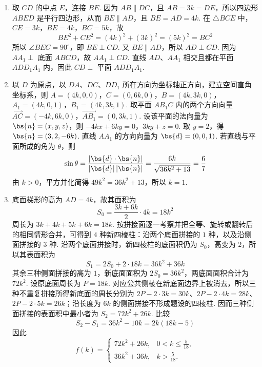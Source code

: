 \begin{solution}
\begin{enumerate}
\item 取 \(CD\) 的中点 \(E\)，连接 \(BE\). 因为 \(AB\parallel DC\)，且 \(AB=3k=DE\)，所以四边形 \(ABED\) 是平行四边形，从而 \(BE\parallel AD\)，且 \(BE=AD=4k\). 在 \(\triangle BCE\) 中，\(CE=3k\)，\(BE=4k\)，\(BC=5k\)，故
\[
BE^2+CE^2=(4k)^2+(3k)^2=(5k)^2=BC^2
\]
所以 \(\angle BEC=90^\circ\)，即 \(BE\perp CD\). 又 \(BE\parallel AD\)，所以 \(AD\perp CD\). 因为 \(AA_1\perp\) 底面 \(ABCD\)，故 \(AA_1\perp CD\). 直线 \(AD\)、\(AA_1\) 相交且都在平面 \(ADD_1A_1\) 内，因此 \(CD\perp\) 平面 \(ADD_1A_1\).
\item 以 \(D\) 为原点，以 \(DA\)、\(DC\)、\(DD_1\) 所在方向为坐标轴正方向，建立空间直角坐标系，则
\(A=(4k,0,0)\)，\(C=(0,6k,0)\)，\(B=(4k,3k,0)\)，\(A_1=(4k,0,1)\)，\(B_1=(4k,3k,1)\).
取平面 \(AB_1C\) 内的两个方向向量
\(\overrightarrow{AC}=(-4k,6k,0)\)，\(\overrightarrow{AB_1}=(0,3k,1)\).
设该平面的法向量为 \(\bs{n}=(x,y,z)\)，则
\(-4kx+6ky=0\)，\(3ky+z=0\).
取 \(y=2\)，得 \(\bs{n}=(3,2,-6k)\). 直线 \(AA_1\) 的方向向量为 \(\bs{d}=(0,0,1)\). 若直线与平面所成的角为 \(\theta\)，则
\[
    \sin\theta=\frac{|\bs{d}\cdot\bs{n}|}{|\bs{d}|\,|\bs{n}|}=\frac{6k}{\sqrt{36k^2+13}}=\frac67
\]
由 \(k>0\)，平方并化简得 \(49k^2=36k^2+13\)，所以 \(k=1\).
\item 底面梯形的高为 \(AD=4k\)，故其面积为
\[
S_0=\frac{3k+6k}{2}\cdot4k=18k^2
\]
周长为 \(3k+4k+5k+6k=18k\). 按拼接面逐一考察并把全等、旋转或翻转后的相同情形合并，可得到 \(4\) 种新四棱柱：沿两个底面拼接的 \(1\) 种，以及沿侧面拼接的 \(3\) 种. 沿两个底面拼接时，新四棱柱的底面积仍为 \(S_0\)，高变为 \(2\)，所以其表面积为
\[
S_1=2S_0+2\cdot18k=36k^2+36k
\]
其余三种侧面拼接的高为 \(1\)，新底面面积为 \(2S_0=36k^2\)，两底面面积合计为 \(72k^2\). 设原底面周长为 \(P=18k\). 对应公共侧棱在新底面边界上被消去，所以三种不重复拼接所得新底面的周长分别为
\(2P-2\cdot3k=30k\)、\(2P-2\cdot4k=28k\)、\(2P-2\cdot5k=26k\)；沿长度为 \(6k\) 的侧面拼接不形成题设的四棱柱. 因而三种侧面拼接的表面积中最小者为 \(S_2=72k^2+26k\). 比较
\[
S_2-S_1=36k^2-10k=2k(18k-5)
\]
因此
\[
f(k)=\begin{cases}
72k^2+26k,&0<k\leqslant\frac{5}{18},\\
36k^2+36k,&k>\frac{5}{18}.
\end{cases}
\]
\end{enumerate}
\end{solution}

